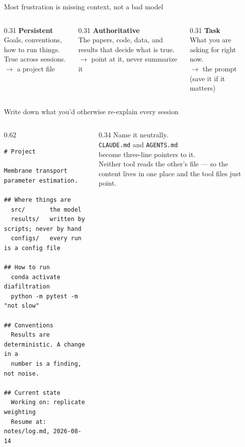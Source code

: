 \begin{frame}{Most frustration is missing context, not a bad model}
  \vfill
  \begin{columns}[t]
    \begin{column}{0.31\textwidth}
      {\color{NDBlue}\textbf{Persistent}}\\[0.4em]
      {\small Goals, conventions, how to run things.\\[0.5em]
      True across sessions.}\\[0.7em]
      {\scriptsize$\rightarrow$ a project file}
    \end{column}
    \begin{column}{0.31\textwidth}
      {\color{NDBlue}\textbf{Authoritative}}\\[0.4em]
      {\small The papers, code, data, and results that decide what is true.}\\[0.7em]
      {\scriptsize$\rightarrow$ point at it, never summarize it}
    \end{column}
    \begin{column}{0.31\textwidth}
      {\color{NDBlue}\textbf{Task}}\\[0.4em]
      {\small What you are asking for right now.}\\[0.7em]
      {\scriptsize$\rightarrow$ the prompt (save it if it matters)}
    \end{column}
  \end{columns}
  \vfill
\end{frame}

\begin{frame}[fragile]{Write down what you'd otherwise re-explain every session}
  \vfill
  \begin{columns}[c]
    \begin{column}{0.62\textwidth}
      \begin{lstlisting}
# Project

Membrane transport parameter estimation.

## Where things are
  src/       the model
  results/   written by scripts; never by hand
  configs/   every run is a config file

## How to run
  conda activate diafiltration
  python -m pytest -m "not slow"

## Conventions
  Results are deterministic. A change in a
  number is a finding, not noise.

## Current state
  Working on: replicate weighting
  Resume at: notes/log.md, 2026-08-14
      \end{lstlisting}
    \end{column}
    \begin{column}{0.34\textwidth}
      \small
      Name it neutrally.\\[0.6em]
      \texttt{CLAUDE.md} and \texttt{AGENTS.md}\\
      become three-line pointers to it.\\[1.2em]
      Neither tool reads the other's file --- so the content lives
      in one place and the tool files just point.
    \end{column}
  \end{columns}
  \vfill
\end{frame}

